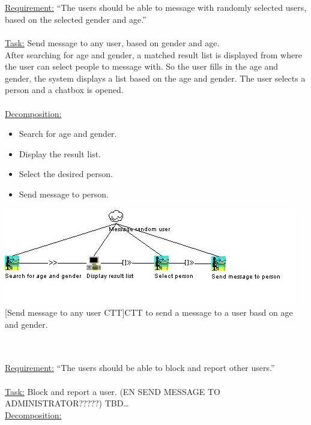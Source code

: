 \documentclass[11pt, a4paper,svglistings,oneside]{book}
\begin{document}
$\;$ \\ \\
\underline{Requirement:} ``The users should be able to message with randomly selected users, based on the selected gender and age.'' \\ \\
\underline{Task:} Send message to any user, based on gender and age. \\
After searching for age and gender, a matched result list is displayed from where the user can select people to message with. So the user fills in the age and gender, the system displays a list based on the age and gender. The user selects a person and a chatbox is opened. \\ \\
\underline{Decomposition:}
\begin{itemize}
\item Search for age and gender.
\item Display the result list.
\item Select the desired person.
\item Send message to person.
\end{itemize}
\noindent\begin{minipage}{\textwidth}
    \centering
   \includegraphics[width=\textwidth]{CTT_Message_Random.png}
 [Send message to any user CTT]{CTT to send a message to a user basd on age and gender.}
\end{minipage}
$\;$ \\ \\
\underline{Requirement:} ``The users should be able to block and report other users.'' \\ \\
\underline{Task:} Block and report a user. (EN SEND MESSAGE TO ADMINISTRATOR?????) TBD\ldots \\
\underline{Decomposition:}
\end{document}
